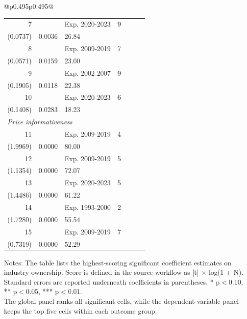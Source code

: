 \begin{table}[!htbp]
\begin{threeparttable}
\begin{tabular}{@{}p{}p{}@{}}
{\begin{tabular}{@{}rllrccc@{}}
7 & \multicolumn{1}{l}{} & Exp. 2020-2023 & 9 & \shortstack{-0.2146***\\(0.0737)} & 0.0036 & 26.84 \\
8 & \multicolumn{1}{l}{} & Exp. 2009-2019 & 7 & \shortstack{-0.1376**\\(0.0571)} & 0.0159 & 23.00 \\
9 & \multicolumn{1}{l}{} & Exp. 2002-2007 & 9 & \shortstack{0.4801**\\(0.1905)} & 0.0118 & 22.38 \\
10 & \multicolumn{1}{l}{} & Exp. 2020-2023 & 6 & \shortstack{-0.3089**\\(0.1408)} & 0.0283 & 18.23 \\
\multicolumn{7}{l}{\textit{Price informativeness}} \\
11 & \multicolumn{1}{l}{} & Exp. 2009-2019 & 4 & \shortstack{-18.0537***\\(1.9969)} & 0.0000 & 80.00 \\
12 & \multicolumn{1}{l}{} & Exp. 2009-2019 & 5 & \shortstack{-8.9452***\\(1.1354)} & 0.0000 & 72.07 \\
13 & \multicolumn{1}{l}{} & Exp. 2020-2023 & 5 & \shortstack{-11.0855***\\(1.4486)} & 0.0000 & 61.22 \\
14 & \multicolumn{1}{l}{} & Exp. 1993-2000 & 2 & \shortstack{-19.0526***\\(1.7280)} & 0.0000 & 55.54 \\
15 & \multicolumn{1}{l}{} & Exp. 2009-2019 & 7 & \shortstack{-4.0113***\\(0.7319)} & 0.0000 & 52.29 \\
\bottomrule
\end{tabular}
}
\end{tabular}
\vspace{0.35em}
\noindent\parbox{\textwidth}{\footnotesize
Notes: The table lists the highest-scoring significant coefficient estimates on industry ownership. Score is defined in the source workflow as |t| $\times$ log(1 + N). Standard errors are reported underneath coefficients in parentheses. * p$<$0.10, ** p$<$0.05, *** p$<$0.01.\\
The global panel ranks all significant cells, while the dependent-variable panel keeps the top five cells within each outcome group.
}
\end{threeparttable}
\end{table}
